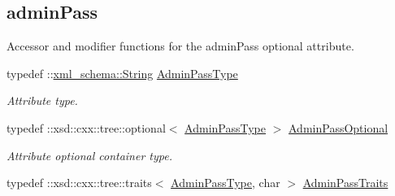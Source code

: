 \subsection*{adminPass}
\label{_amgrpba73637a27dfcb35a5d4310a1ef995f3}
Accessor and modifier functions for the adminPass optional attribute. \begin{DoxyCompactItemize}
\item 
\hypertarget{classopenstack_1_1xml_1_1Server_a1fb88fb3dae6adc1c0ac106fafdbe99d}{
typedef ::\hyperlink{namespacexml__schema_af6757b5701ccc893f3b551bd70e0c94d}{xml\_\-schema::String} \hyperlink{classopenstack_1_1xml_1_1Server_a1fb88fb3dae6adc1c0ac106fafdbe99d}{AdminPassType}}
\label{classopenstack_1_1xml_1_1Server_a1fb88fb3dae6adc1c0ac106fafdbe99d}

\begin{DoxyCompactList}\small\item\em Attribute type. \item\end{DoxyCompactList}\item 
\hypertarget{classopenstack_1_1xml_1_1Server_a32f6b9381619923d13b82a0a8a964893}{
typedef ::xsd::cxx::tree::optional$<$ \hyperlink{classopenstack_1_1xml_1_1Server_a1fb88fb3dae6adc1c0ac106fafdbe99d}{AdminPassType} $>$ \hyperlink{classopenstack_1_1xml_1_1Server_a32f6b9381619923d13b82a0a8a964893}{AdminPassOptional}}
\label{classopenstack_1_1xml_1_1Server_a32f6b9381619923d13b82a0a8a964893}

\begin{DoxyCompactList}\small\item\em Attribute optional container type. \item\end{DoxyCompactList}\item 
\hypertarget{classopenstack_1_1xml_1_1Server_a98c9051a138b09ac1f9d014a99c3eaa0}{
typedef ::xsd::cxx::tree::traits$<$ \hyperlink{classopenstack_1_1xml_1_1Server_a1fb88fb3dae6adc1c0ac106fafdbe99d}{AdminPassType}, char $>$ \hyperlink{classopenstack_1_1xml_1_1Server_a98c9051a138b09ac1f9d014a99c3eaa0}{AdminPassTraits}}
\label{classopenstack_1_1xml_1_1Server_a98c9051a138b09ac1f9d014a99c3eaa0}


\end{DoxyCompactItemize}
